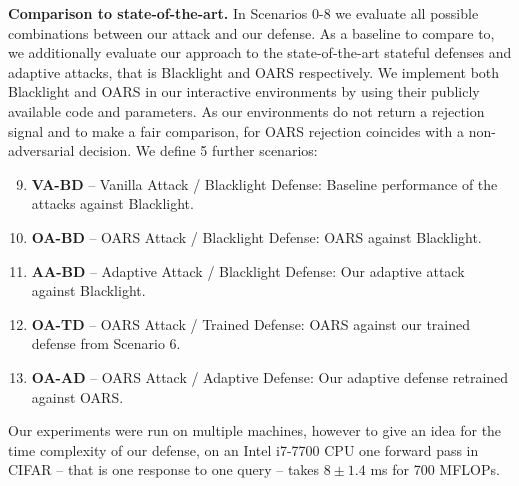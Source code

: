 \textbf{Comparison to state-of-the-art.} In Scenarios 0-8 we evaluate all possible combinations between our attack and our defense.
As a baseline to compare to, we additionally evaluate our approach to the state-of-the-art stateful defenses and adaptive attacks, that is Blacklight \cite{li2022blacklight} and OARS \cite{feng2023stateful} respectively.
We implement both Blacklight and OARS in our interactive environments by using their publicly available code and parameters.
As our environments do not return a rejection signal and to make a fair comparison, for OARS rejection coincides with a non-adversarial decision.
We define 5 further scenarios:

\begin{enumerate}[leftmargin=*]
\setcounter{enumi}{8} 
    \setlength\itemsep{0.1em}
    \item \textbf{VA-BD} -- Vanilla Attack / Blacklight Defense: Baseline performance of the attacks against Blacklight.
    \item \textbf{OA-BD} -- OARS Attack / Blacklight Defense: OARS against Blacklight.
    \item \textbf{AA-BD} -- Adaptive Attack / Blacklight Defense: Our adaptive attack against Blacklight.
    \item \textbf{OA-TD} -- OARS Attack / Trained Defense: OARS against our trained defense from Scenario 6.
    \item \textbf{OA-AD} -- OARS Attack / Adaptive Defense: Our adaptive defense retrained against OARS.
\end{enumerate}

Our experiments were run on multiple machines, however to give an idea for the time complexity of our defense, on an Intel i7-7700 CPU one forward pass in CIFAR -- that is one response to one query -- takes $8 \pm 1.4$ ms for 700 MFLOPs.

